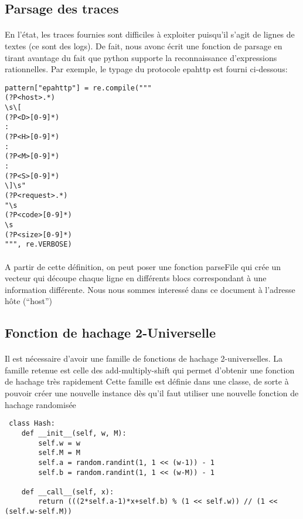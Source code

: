 \documentclass[a4paper,11pt]{article}%
\begin{document}
\subsection{Parsage des traces}

\paragraph{}En l'état, les traces fournies sont difficiles à exploiter puisqu'il s'agit de lignes de textes (ce sont des logs). De fait, nous avonc écrit une fonction de parsage\newline
en tirant avantage du fait que python supporte la reconnaissance d'expressions rationnelles. Par exemple, le typage du protocole epahttp est fourni ci-dessous:

\begin{lstlisting}
pattern["epahttp"] = re.compile("""
(?P<host>.*)
\s\[
(?P<D>[0-9]*)
:
(?P<H>[0-9]*)
:
(?P<M>[0-9]*)
:
(?P<S>[0-9]*)
\]\s"
(?P<request>.*)
"\s
(?P<code>[0-9]*)
\s
(?P<size>[0-9]*)
""", re.VERBOSE)
\end{lstlisting}

\paragraph{}A partir de cette définition, on peut poser une fonction parseFile qui crée un vecteur qui découpe chaque ligne en différents blocs correspondant à une information différente. Nous nous sommes interessé dans ce document\newline
à l'adresse hôte (``host'')

\subsection{Fonction de hachage 2-Universelle}

\paragraph{}Il est nécessaire d'avoir une famille de fonctions de hachage 2-universelles. La famille retenue est celle des add-multiply-shift qui permet d'obtenir une fonction de hachage très rapidement\newline
Cette famille est définie dans une classe, de sorte à pouvoir créer une nouvelle instance dès qu'il faut utiliser une nouvelle fonction de hachage randomisée

\begin{lstlisting}
 class Hash:
    def __init__(self, w, M):
        self.w = w
        self.M = M
        self.a = random.randint(1, 1 << (w-1)) - 1
        self.b = random.randint(1, 1 << (w-M)) - 1
        
    def __call__(self, x):
        return (((2*self.a-1)*x+self.b) % (1 << self.w)) // (1 << (self.w-self.M))
\end{lstlisting}
\end{document}
